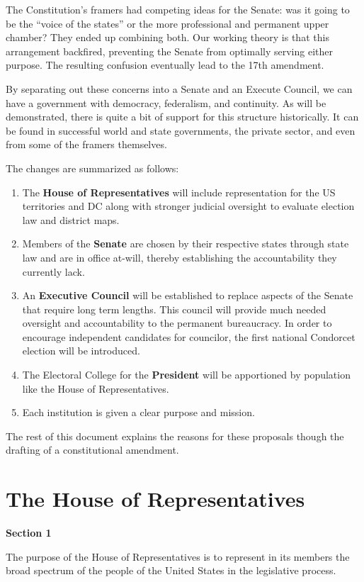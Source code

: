 \documentclass{article}
\newcommand{\quotes}[1]{``#1''}
\begin{document}
The Constitution's framers had competing ideas for the Senate: was it going to be the \quotes{voice of the states} or the more professional and permanent upper chamber? They ended up combining both. Our working theory is that this arrangement backfired, preventing the Senate from optimally serving either purpose. The resulting confusion eventually lead to the 17th amendment.

By separating out these concerns into a Senate and an Execute Council, we can have a government with democracy, federalism, and continuity. As will be demonstrated, there is quite a bit of support for this structure historically. It can be found in successful world and state governments, the private sector, and even from some of the framers themselves.

The changes are summarized as follows:
\begin{enumerate}
  \item The \textbf{House of Representatives} will include representation for the US territories and DC along with stronger judicial oversight to evaluate election law and district maps.
  \item Members of the \textbf{Senate} are chosen by their respective states through state law and are in office at-will, thereby establishing the accountability they currently lack.
  \item An \textbf{Executive Council} will be established to replace aspects of the Senate that require long term lengths. This council will provide much needed oversight and accountability to the permanent bureaucracy. In order to encourage independent candidates for councilor, the first national Condorcet election will be introduced.
  \item The Electoral College for the \textbf{President} will be apportioned by population like the House of Representatives.
 \item Each institution is given a clear purpose and mission.
\end{enumerate}

The rest of this document explains the reasons for these proposals though the drafting of a constitutional amendment.

\section{The House of Representatives}

\begin{quoting}
\textbf{Section 1}

The purpose of the House of Representatives is to represent in its members the broad spectrum of the people of the United States in the legislative process.
\end{quoting}
\end{document}
